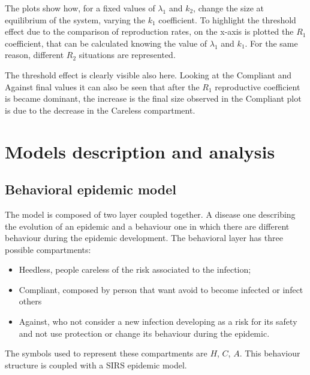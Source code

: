 The plots show how, for a fixed values of $\lambda_1$ and $k_2$, change the size at equilibrium of the system, varying the $k_1$ coefficient. To highlight the threshold effect due to the comparison of reproduction rates, on the x-axis is plotted the $R_1$  coefficient, that can be calculated knowing the value of  $\lambda_1$ and $k_1$. For the same reason, different $R_2$ situations are represented. 

The threshold effect is clearly visible also here. Looking at the Compliant and Against final values it can also be seen that after the $R_1$ reproductive coefficient is became dominant, the  increase is the final size observed in the Compliant plot is due to the decrease in the Careless compartment. 





\chapter{Models description and analysis}
\section{Behavioral epidemic model}

The model is composed of two layer coupled together. A disease one describing the evolution of an epidemic and a behaviour one in which there are different behaviour during the epidemic development.
The behavioral layer has three possible compartments: 

\begin{itemize}
	\item Heedless, people careless of the risk associated to the infection;
	\item Compliant, composed by person that want avoid to become infected or infect others
	\item Against, who not consider a new infection developing as a risk for its safety and not use protection or change its behaviour during the epidemic. 
\end{itemize}
The symbols used to represent these compartments are $H$, $C$, $A$.
This behaviour structure is coupled with a SIRS epidemic model.

